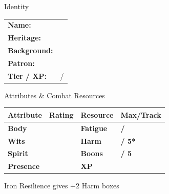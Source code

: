 \documentclass[10pt]{article}
\begin{document}
\begin{minipage}[t]{0.48\linewidth}
    \begin{charbox}{Identity}
        \begin{tabular}{p{2.5cm} p{5cm}}
            \textbf{Name:} & \underline{\hspace{4cm}} \\
            \textbf{Heritage:} & \underline{\hspace{4cm}} \\
            \textbf{Background:} & \underline{\hspace{4cm}} \\
            \textbf{Patron:} & \underline{\hspace{4cm}} \\
            \textbf{Tier / XP:} & \underline{\hspace{2cm}} / \underline{\hspace{2cm}} \\
        \end{tabular}
    \end{charbox}
    
    \vspace{0.5em}
    
    \begin{charbox}{Attributes \& Combat Resources}
        \begin{tabular}{>{\bfseries}p{2.5cm} >{\bfseries}p{1.5cm} >{\bfseries}p{2.5cm} >{\bfseries}p{1.5cm}}
            \toprule
            \textbf{Attribute} & \textbf{Rating} & \textbf{Resource} & \textbf{Max/Track} \\
            \midrule
            Body & \underline{\hspace{1.5cm}} & Fatigue & \underline{\hspace{1.5cm}} / \underline{\hspace{1.5cm}} \\
            Wits & \underline{\hspace{1.5cm}} & Harm & \underline{\hspace{1.5cm}} / 5* \\
            Spirit & \underline{\hspace{1.5cm}} & Boons & \underline{\hspace{1.5cm}} / 5 \\
            Presence & \underline{\hspace{1.5cm}} & XP & \underline{\hspace{1.5cm}} \\
            \bottomrule
        \end{tabular}
        {\small *Iron Resilience gives +2 Harm boxes}
    \end{charbox}
    

\end{minipage}
\end{document}
